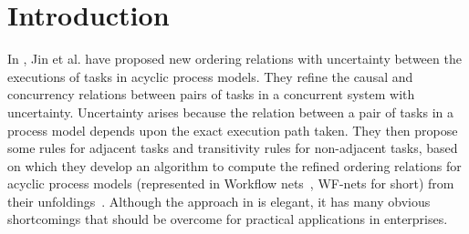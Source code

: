\documentclass{llncs}
\begin{document}
\section{Introduction}\label{sec:introduction}

In \cite{jin2014computing}, Jin et al. have proposed new ordering relations with uncertainty between the executions of tasks in acyclic process models. They refine the causal and concurrency relations between pairs of tasks in a concurrent system with uncertainty. Uncertainty arises because the relation between a pair of tasks in a process model depends upon the exact execution path taken. They then propose some rules for adjacent tasks and transitivity rules for non-adjacent tasks, based on which they develop an algorithm to compute the refined ordering relations for acyclic process models (represented in Workflow nets~\cite{van1998application}, WF-nets for short) from their unfoldings~\cite{mcmillan1995technique,esparza2002improvement}. Although the approach in \cite{jin2014computing} is elegant, it has many obvious shortcomings that should be overcome for practical applications in enterprises.
\end{document}
